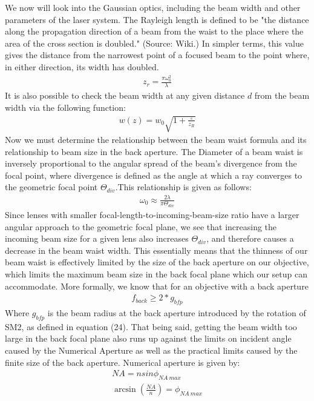 We now will look into the Gaussian optics, including the beam width and other parameters of the laser system.
The Rayleigh length is defined to be "the distance along the propagation direction of a beam from the waist to the place where the area of the cross section is doubled." (Source: Wiki.) In simpler terms, this value gives the distance from the narrowest point of a focused beam to the point where, in either direction, its width has doubled.
\begin{gather}
    z_r = \frac{\pi \omega_0^2}{\lambda}
\end{gather}
It is also possible to check the beam width at any given distance $d$ from the beam width via the following function:
\begin{gather}
    w(z) = w_0\sqrt{1+\frac{z}{z_R}}
\end{gather}
Now we must determine the relationship between the beam waist formula and its relationship to beam size in the back aperture. The Diameter of a beam waist is inversely proportional to the angular spread of the beam's divergence from the focal point, where divergence is defined as the angle at which a ray converges to the geometric focal point $\Theta_{div}$.This relationship is given as follows:
\begin{gather}
    \omega_0 \approx \frac{2 \lambda }{\pi \Theta_{div}}
\end{gather}
Since lenses with smaller focal-length-to-incoming-beam-size ratio have a larger angular approach to the geometric focal plane, we see that increasing the incoming beam size for a given lens also increases $\Theta_{div}$, and therefore causes a decrease in the beam waist width. This essentially means that the thinness of our beam waist is effectively limited by the size of the back aperture on our objective, which limits the maximum beam size in the back focal plane which our setup can accommodate. More formally, we know that for an objective with a back aperture 
\begin{gather}
    f_{back} \geq 2*g_{bfp}
\end{gather}
Where $g_{bfp}$ is the beam radius at the back aperture introduced by the rotation of SM2, as defined in equation (24).
That being said, getting the beam width too large in the back focal plane also runs up against the limits on incident angle caused by the Numerical Aperture as well as the practical limits caused by the finite size of the back aperture. Numerical aperture is given by:
\begin{gather}
    NA = nsin\phi_{NA \ max}\\
    \arcsin(\frac{NA}{n}) = \phi_{NA \ max}    
\end{gather}
